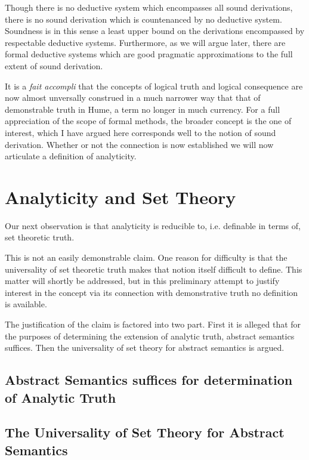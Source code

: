 \documentclass[numreferences]{rbjk}
\begin{document}
\begin{article}
{Though there is no deductive system which encompasses all sound derivations, there is no sound derivation which is countenanced by no deductive system.
Soundness is in this sense a least upper bound on the derivations encompassed by respectable deductive systems.
Furthermore, as we will argue later, there are formal deductive systems which are good pragmatic approximations to the full extent of sound derivation.

It is a {\it fait accompli} that the concepts of logical truth and logical consequence are now almost unversally construed in a much narrower way that that of demonstrable truth in Hume, a term no longer in much currency.
For a full appreciation of the scope of formal methods, the broader concept is the one of interest, which I have argued here corresponds well to the notion of sound derivation.
Whether or not the connection is now established we will now articulate a definition of analyticity.

}

\section{Analyticity and Set Theory}

Our next observation is that analyticity is reducible to, i.e. definable in terms of, set theoretic truth.

This is not an easily demonstrable claim.
One reason for difficulty is that the universality of set theoretic truth makes that notion itself difficult to define.
This matter will shortly be addressed, but in this preliminary attempt to justify interest in the concept via its connection with demonstrative truth no definition is available.

The justification of the claim is factored into two part.
First it is alleged that for the purposes of determining the extension of analytic truth, abstract semantics suffices.
Then the universality of set theory for abstract semantics is argued.

\subsection{Abstract Semantics suffices for determination of Analytic Truth}



\subsection{The Universality of Set Theory for Abstract Semantics}


\end{article}
\end{document}
